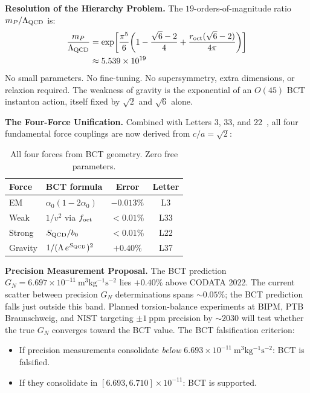 \documentclass[aps,prl,twocolumn,superscriptaddress,floatfix]{revtex4-2}
\begin{document}
\medskip
\noindent\textbf{Resolution of the Hierarchy Problem.}
The $19$-orders-of-magnitude ratio $m_P/\Lambda_{\rm QCD}$ is:
\begin{align}
  \frac{m_P}{\Lambda_{\rm QCD}} &= \exp\!\left[\frac{\pi^5}{6}\!\left(1 - \frac{\sqrt{6}-2}{4} + \frac{r_{\rm oct}(\sqrt{6}-2)}{4\pi}\right)\right] \notag\\
  &\approx 5.539\times10^{19}
  \label{eq:hierarchy}
\end{align}
No small parameters. No fine-tuning. No supersymmetry, extra dimensions,
or relaxion required. The weakness of gravity is the exponential of
an $O(45)$ BCT instanton action, itself fixed by $\sqrt{2}$ and $\sqrt{6}$ alone.

\medskip
\noindent\textbf{The Four-Force Unification.}
Combined with Letters 3, 33, and 22~\cite{L3,L33,L22}, all four fundamental
force couplings are now derived from $c/a = \sqrt{2}$:
\begin{table}[h]
\centering
\caption{All four forces from BCT geometry. Zero free parameters.}
\label{tab:4forces}
\begin{tabular}{llcc}
\toprule
Force & BCT formula & Error & Letter \\
\midrule
EM & $\alpha_0(1-2\alpha_0)$ & $-0.013\%$ & L3 \\
Weak & $1/v^2$ via $f_{\rm oct}$ & ${<}0.01\%$ & L33 \\
Strong & $S_{\rm QCD}/b_0$ & ${<}0.01\%$ & L22 \\
Gravity & $1/(\Lambda\,e^{S_{\rm QCD}})^2$ & $+0.40\%$ & L37 \\
\bottomrule
\end{tabular}
\end{table}

\medskip
\noindent\textbf{Precision Measurement Proposal.}
The BCT prediction $G_N = 6.697\times10^{-11}\ \mathrm{m^3kg^{-1}s^{-2}}$
lies $+0.40\%$ above CODATA 2022. The current scatter between precision
$G_N$ determinations spans $\sim 0.05\%$; the BCT prediction falls
just outside this band. Planned torsion-balance experiments at BIPM,
PTB Braunschweig, and NIST targeting $\pm 1\ \mathrm{ppm}$ precision
by $\sim 2030$ will test whether the true $G_N$ converges toward the
BCT value. The BCT falsification criterion:
\begin{itemize}
  \item If precision measurements consolidate \emph{below}
    $6.693\times10^{-11}\ \mathrm{m^3kg^{-1}s^{-2}}$: BCT is falsified.
  \item If they consolidate in $[6.693, 6.710]\times10^{-11}$: BCT is supported.
\end{itemize}
\end{document}
